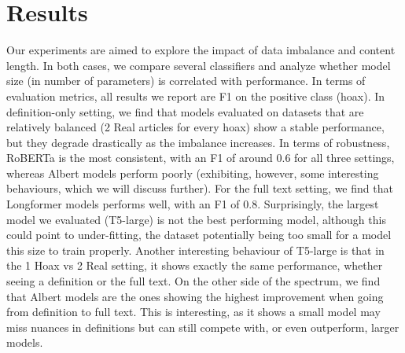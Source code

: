 \begin{comment}
    \begin{subfigure}[b]{0.7\textwidth}
        \texttt{[image: latex/images/ft\_def\_comp/fulltexts.png]}
        \caption{Comparison of Fulltext settings}
        \label{fig:ft_comparison}
    \end{subfigure}

    \caption{F1 on positive class performance after exposing models to either the full text (Fulltext setting) and only the definition (Definition setting).}
    \label{fig:all_setting_comparison}
\end{figure*}
\end{comment}
\begin{comment}
\begin{figure*}[!h]
        \centering
        \texttt{[image: images/all\_comp.png]}
        \caption{F1 on positive class performance after exposing models to either the full text (Fulltext setting) and only the definition (Definition setting).}
        \label{fig:all_setting_comparison}
\end{figure*}
\end{comment}


\section{Results}

Our experiments are aimed to explore the impact of data imbalance and content length. In both cases, we compare several classifiers and analyze whether model size (in number of parameters) is correlated with performance. In terms of evaluation metrics, all results we report are F1 on the positive class (hoax). In definition-only setting, we find that models evaluated on datasets that are relatively balanced (2 Real articles for every hoax) show a stable performance, but they degrade drastically as the imbalance increases. In terms of robustness, RoBERTa is the most consistent, with an F1 of around 0.6 for all three settings, whereas Albert models perform poorly (exhibiting, however, some interesting behaviours, which we will discuss further). For the full text setting, we find that Longformer models performs well, with an F1 of 0.8. Surprisingly, the largest model we evaluated (T5-large) is not the best performing model, although this could point to under-fitting, the dataset potentially being too small for a model this size to train properly. Another interesting behaviour of T5-large is that in the 1 Hoax vs 2 Real setting, it shows exactly the same performance, whether seeing a definition or the full text. On the other side of the spectrum, we find that Albert models are the ones showing the highest improvement when going from definition to full text. This is interesting, as it shows a small model may miss nuances in definitions but can still compete with, or even outperform, larger models.



